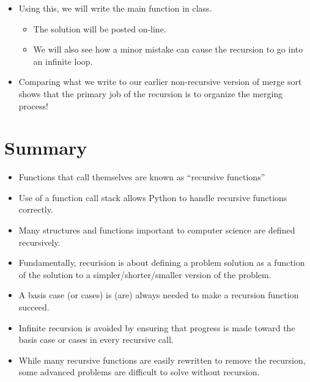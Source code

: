 \documentclass[letterpaper,10pt,english]{sphinxmanual}
\begin{document}
\begin{itemize}
\item {} 
Using this, we will write the main  function in class.

%
\begin{sphinxVerbatim}[commandchars=\\\{\}]
 
\end{sphinxVerbatim}
\begin{itemize}
\item {} 
The solution will be posted on-line.

\item {} 
We will also see how a minor mistake can cause the recursion to
go into an infinite loop.

\end{itemize}

\item {} 
Comparing what we write to our earlier non-recursive version of merge
sort shows that the primary job of the recursion is to organize the
merging process!

\end{itemize}


\section{Summary}
\label{\detokenize{lecture_notes/lec23_recursion:summary}}\begin{itemize}
\item {} 
Functions that call themselves are known as “recursive functions”

\item {} 
Use of a function call stack allows Python to handle recursive
functions correctly.

\item {} 
Many structures and functions important to computer science are
defined recursively.

\item {} 
Fundamentally, recurision is about defining a problem solution as a
function of the solution to a simpler/shorter/smaller version of the
problem.

\item {} 
A basis case (or cases) is (are) always needed to make a recursion
function succeed.

\item {} 
Infinite recursion is avoided by ensuring that progress is made toward
the basis case or cases in every recursive call.

\item {} 
While many recursive functions are easily rewritten to remove the
recursion, some advanced problems are difficult to solve without
recursion.

\end{itemize}
\end{document}
